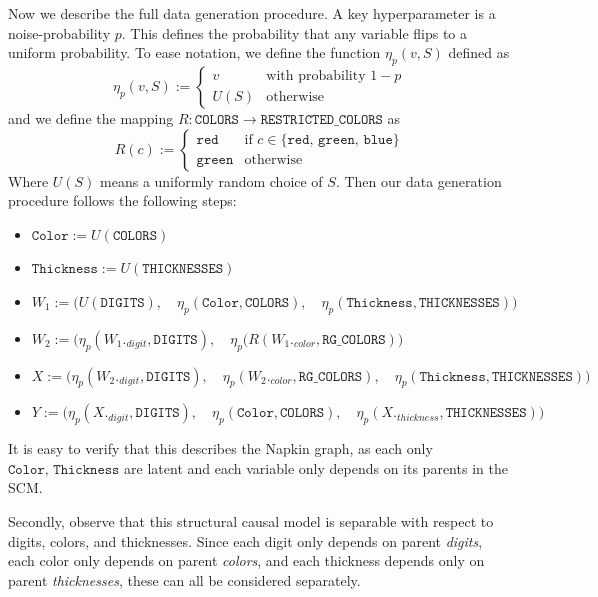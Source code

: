 \documentclass{article}
\theoremstyle{plain}
\theoremstyle{definition}
\theoremstyle{remark}
\begin{document}
	Now we describe the full data generation procedure. A key hyperparameter is a noise-probability $p$. This defines the probability that any variable flips to a uniform probability. To ease notation, we define the function $\eta_p(v, S)$ defined as 
	\[  
	\eta_p(v, S) :=     \begin{cases}
		v & \text{with probability  } 1-p\\
		U(S) & \text{otherwise }
	\end{cases}
	\]
	and we define the mapping $R: \texttt{COLORS}\to \texttt{RESTRICTED\_COLORS}$ as 
	\[
	R(c) := \begin{cases}
		\texttt{red} & \text{if  } c\in \{\texttt{red, green, blue}\}\\
		\texttt{green} & \text{otherwise }
	\end{cases}
	\]
	Where $U(S)$ means a uniformly random choice of $S$.
	Then our data generation procedure follows the following steps:
	\begin{itemize}
		\item $\texttt{Color} := U(\texttt{COLORS})$
		\item $\texttt{Thickness}:= U(\texttt{THICKNESSES})$
		\item $W_1 := \big(U(\texttt{DIGITS}),\quad \eta_p(\texttt{Color}, \texttt{COLORS}),\quad \eta_p(\texttt{Thickness}, \texttt{THICKNESSES})\big)$
		\item $W_2 := \big(\eta_p(W_{1}._{digit}, \texttt{DIGITS}),\quad \eta_p(R(W_{1}._{color}, \texttt{RG\_COLORS})\big)$
		\item $X := \big(\eta_p(W_{2}._{digit}, \texttt{DIGITS}),\quad \eta_p(W_{2}._{color}, \texttt{RG\_COLORS}),\quad \eta_p(\texttt{Thickness}, \texttt{THICKNESSES})\big)$
		\item $Y := \big(\eta_p(X._{digit}, \texttt{DIGITS}),\quad \eta_p(\texttt{Color}, \texttt{COLORS}),\quad \eta_p(X._{thickness}, \texttt{THICKNESSES})\big)$
	\end{itemize}
	
	It is easy to verify that this describes the Napkin graph, as each only $\texttt{Color, Thickness}$ are latent and each variable only depends on its parents in the SCM. 
	
	Secondly, observe that this structural causal model is separable with respect to digits, colors, and thicknesses. Since each digit only depends on parent \emph{digits}, each color only depends on parent \emph{colors}, and each thickness depends only on parent \emph{thicknesses}, these can all be considered separately. 
	
\end{document}
